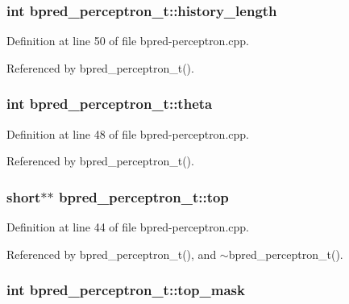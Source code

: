 \subsubsection[{history\_\-length}]{\setlength{\rightskip}{0pt plus 5cm}int {\bf bpred\_\-perceptron\_\-t::history\_\-length}\hspace{0.3cm}{\tt  [protected]}}\label{classbpred__perceptron__t_ff7cdec8a6cba61e42ceb898c23e779d}




Definition at line 50 of file bpred-perceptron.cpp.

Referenced by bpred\_\-perceptron\_\-t().
\subsubsection[{theta}]{\setlength{\rightskip}{0pt plus 5cm}int {\bf bpred\_\-perceptron\_\-t::theta}\hspace{0.3cm}{\tt  [protected]}}\label{classbpred__perceptron__t_9f38d84403ef0caed14f83745a0d07f3}




Definition at line 48 of file bpred-perceptron.cpp.

Referenced by bpred\_\-perceptron\_\-t().
\subsubsection[{top}]{\setlength{\rightskip}{0pt plus 5cm}short$\ast$$\ast$ {\bf bpred\_\-perceptron\_\-t::top}\hspace{0.3cm}{\tt  [protected]}}\label{classbpred__perceptron__t_9fb0cf38d950bf1c277eb4e850787f33}




Definition at line 44 of file bpred-perceptron.cpp.

Referenced by bpred\_\-perceptron\_\-t(), and $\sim$bpred\_\-perceptron\_\-t().
\subsubsection[{top\_\-mask}]{\setlength{\rightskip}{0pt plus 5cm}int {\bf bpred\_\-perceptron\_\-t::top\_\-mask}\hspace{0.3cm}{\tt  [protected]}}\label{classbpred__perceptron__t_864d9cd08446b588af0c4b1f6cb43cb2}




